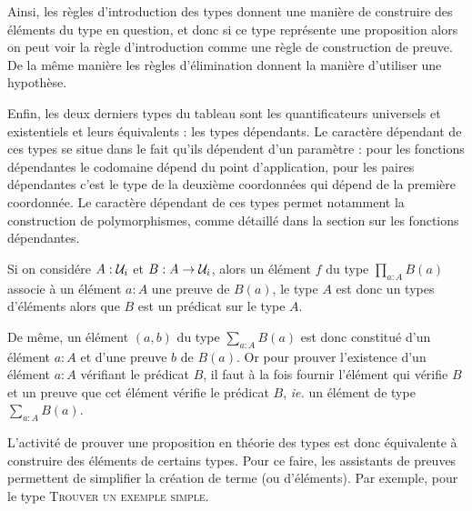 \documentclass[../../rapport.tex]{subfiles}
\begin{document}
  Ainsi, les règles d'introduction des types donnent une manière de construire des éléments du type en question,
  et donc si ce type représente une proposition alors on peut voir la règle d'introduction comme une règle de construction de preuve.
  De la même manière les règles d'élimination donnent la manière d'utiliser une hypothèse.

  Enfin, les deux derniers types du tableau sont les quantificateurs universels et existentiels et leurs équivalents : les types dépendants.
  Le caractère dépendant de ces types se situe dans le fait qu'ils dépendent d'un paramètre :
  pour les fonctions dépendantes le codomaine dépend du point d'application,
  pour les paires dépendantes c'est le type de la deuxième coordonnées qui dépend de la première coordonnée.
  Le caractère dépendant de ces types permet notamment la construction de polymorphismes,
  comme détaillé dans la section sur les fonctions dépendantes.

  Si on considére $A : \mathcal U_i$ et $B : A \rightarrow \mathcal U_i$, alors un élément $f$ du type $\prod_{a: A}B(a)$ associe à un élément $a : A$
  une preuve de $B(a)$, le type $A$ est donc un types d'éléments alors que $B$ est un prédicat sur le type $A$.

  De même, un élément $(a, b)$ du type $\sum_{a:A}B(a)$ est donc constitué d'un élément $a : A$ et d'une preuve $b$ de $B(a)$.
  Or pour prouver l'existence d'un élément $a : A$ vérifiant le prédicat $B$, il faut à la fois fournir l'élément qui vérifie $B$
  et un preuve que cet élément vérifie le prédicat $B$, \textit{ie.} un élément de type $\sum_{a:A}B(a)$.

  L'activité de prouver une proposition en théorie des types est donc équivalente à construire des éléments de certains types.
  Pour ce faire, les assistants de preuves permettent de simplifier la création de terme (ou d'éléments).
  Par exemple, pour le type \textsc{Trouver un exemple simple}.
\end{document}

